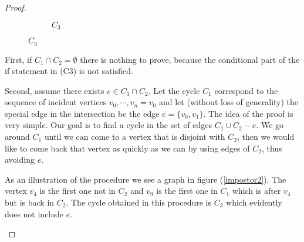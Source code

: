 \begin{proof}
\begin{enumerate}
\begin{figure}[h]
\begin{subfigure}[h]{0.245\textwidth}
\end{subfigure}
\begin{subfigure}[h]{0.245\textwidth}
  \caption{$C _3$} 
\end{subfigure}
    \end{figure}

    First, if $C_1 \cap C_2 = \emptyset$ there is nothing to prove, because the conditional part of the if statement in (C3) is not satisfied.
   
   Second, assume there exists $e \in C_1 \cap C_2$. Let the cycle $C_1$ correspond to the sequence of incident vertices  $v_0, \cdots, v_n = v_0$ and let (without loss of generality) the special edge in the intersection be the edge $e = \{v_0, v_1\}$. The idea of the proof is very simple. Our goal is to find a cycle in the set of edges $C_1 \cup C_2 -e$. We go around $C_1$ until we can come to a vertex that is disjoint with $C_2$, then we would like to come back that vertex as quickly as we can by using edges of $C_2$, thus avoiding $e.$

   As an illustration of the procedure we see a graph in figure (\ref{impostor2}). The vertex $v_4$ is the first one not in $C_2$ and $v_9$ is the first one in $C_1$ which is after $v_4$ but is back in $C_2$. The cycle obtained in this procedure is $C_3$ which evidently does not include $e.$



\end{enumerate}
\end{proof}

